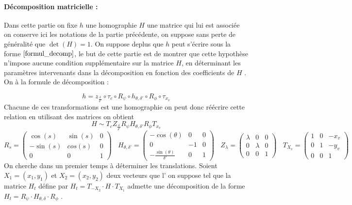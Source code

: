 \paragraph{Décomposition matricielle :}


Dans cette partie on fixe $h$ une homographie $H$ une matrice qui lui est associée on conserve ici les notations de la partie précédente, on suppose sans perte de généralité que $\det (H)=1$. On suppose deplus que $h$ peut s'écrire sous la forme $\ref{formul_decomp}$, le but de cette partie est de montrer que cette hypothèse n'impose aucune condition supplémentaire sur la matrice $H$, en déterminant les paramètres intervenants dans la décomposition en fonction des coefficients de $H$ .\\
On à la formule de décomposition :

\begin{equation*}
h=z_{\frac{\delta}{\delta'}} \circ \tau_{c}\circ R_{\psi} \circ h_{\theta,\delta'} \circ R_{\phi} \circ \tau_{x_{v}}
\end{equation*}
Chacune de ces transformations est une homographie on peut donc réécrire cette relation en utilisant des matrices on obtient 
 \begin{equation*}
H\sim T_{c} Z_{\frac{\delta}{\delta'}}  R_{\psi}  H_{\theta,\delta'} R_{\phi}  T_{x_{v}}
\end{equation*}
\begin{equation*}
R_{s}=\begin{pmatrix}
\cos(s)&\sin(s)&0\\-\sin(s)&cos(s)&0\\0&0&1
\end{pmatrix}
~~~~H_{\theta,\delta'}=\begin{pmatrix}
-\cos(\theta)&0&0\\0&-1&0\\-\frac{\sin(\theta)}{\delta'}&0&1
\end{pmatrix}
~~~~Z_{\lambda}=\begin{pmatrix}
\lambda&0&0\\0&\lambda&0\\0&0&1
\end{pmatrix}
~~~~T_{X_{v}}=\begin{pmatrix}
1&0&-x_{v}\\0&1&-y_{v}\\0&0&1
\end{pmatrix}
\end{equation*}
 On cherche dans un premier temps à déterminer les translations. Soient $X_1 = (x_1 , y_1 )$ et $X_2 = (x_2 , y_2 )$ deux vecteurs que l' on suppose tel que la matrice $H_t$ défine par $H_t = T_{-X_2}  \cdot H \cdot T_{X_1}$ admette une décomposition de la forme  $H_t=R_{\psi} \cdot H_{\theta,\delta} \cdot R_{\phi}$ .\\
